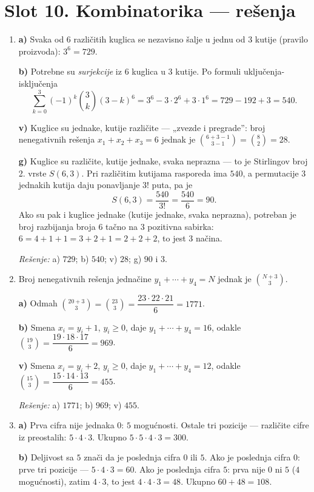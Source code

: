 \section*{Slot 10. Kombinatorika — rešenja}
\begin{enumerate}[label=\arabic*.]
\item \textbf{a)} Svaka od $6$ različitih kuglica se nezavisno šalje u jednu od $3$ kutije (pravilo proizvoda): $3^6=729$.

\textbf{b)} Potrebne su \emph{surjekcije} iz $6$ kuglica u $3$ kutije. Po formuli uključenja-isključenja
\[
\sum_{k=0}^{3}(-1)^k\binom{3}{k}(3-k)^6=3^6-3\cdot 2^6+3\cdot 1^6=729-192+3=540.
\]

\textbf{v)} Kuglice su jednake, kutije različite — „zvezde i pregrade”: broj nenegativnih rešenja $x_1+x_2+x_3=6$ jednak je $\binom{6+3-1}{3-1}=\binom{8}{2}=28$.

\textbf{g)} Kuglice su različite, kutije jednake, svaka neprazna — to je Stirlingov broj 2. vrste $S(6,3)$. Pri različitim kutijama rasporeda ima $540$, a permutacije $3$ jednakih kutija daju ponavljanje $3!$ puta, pa je
\[
S(6,3)=\frac{540}{3!}=\frac{540}{6}=90.
\]
Ako su pak i kuglice jednake (kutije jednake, svaka neprazna), potreban je broj razbijanja broja $6$ tačno na $3$ pozitivna sabirka: $6=4+1+1=3+2+1=2+2+2$, to jest $3$ načina.

\emph{Rešenje:} a) $729$; \; b) $540$; \; v) $28$; \; g) $90$ i $3$.

\item Broj nenegativnih rešenja jednačine $y_1+\cdots+y_4=N$ jednak je $\binom{N+3}{3}$.

\textbf{a)} Odmah $\binom{20+3}{3}=\binom{23}{3}=\dfrac{23\cdot 22\cdot 21}{6}=1771$.

\textbf{b)} Smena $x_i=y_i+1$, $y_i\ge 0$, daje $y_1+\cdots+y_4=16$, odakle $\binom{19}{3}=\dfrac{19\cdot 18\cdot 17}{6}=969$.

\textbf{v)} Smena $x_i=y_i+2$, $y_i\ge 0$, daje $y_1+\cdots+y_4=12$, odakle $\binom{15}{3}=\dfrac{15\cdot 14\cdot 13}{6}=455$.

\emph{Rešenje:} a) $1771$; \; b) $969$; \; v) $455$.

\item \textbf{a)} Prva cifra nije jednaka $0$: $5$ mogućnosti. Ostale tri pozicije — različite cifre iz preostalih: $5\cdot 4\cdot 3$. Ukupno $5\cdot 5\cdot 4\cdot 3=300$.

\textbf{b)} Deljivost sa $5$ znači da je poslednja cifra $0$ ili $5$. Ako je poslednja cifra $0$: prve tri pozicije — $5\cdot 4\cdot 3=60$. Ako je poslednja cifra $5$: prva nije $0$ ni $5$ ($4$ mogućnosti), zatim $4\cdot 3$, to jest $4\cdot 4\cdot 3=48$. Ukupno $60+48=108$.


\end{enumerate}
